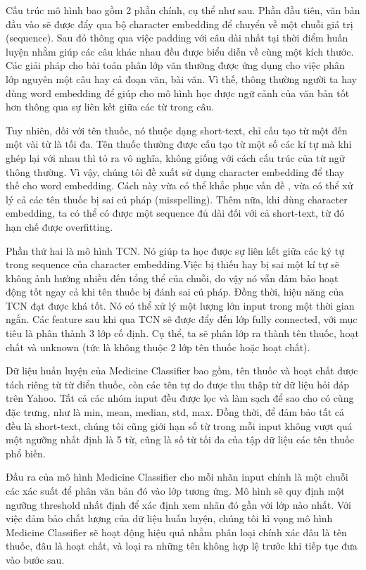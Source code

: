 Cấu trúc mô hình bao gồm 2 phần chính, cụ thể như sau. Phần đầu tiên, văn bản đầu vào sẽ được đẩy qua bộ character embedding để chuyển về một chuỗi giá trị (sequence). Sau đó thông qua việc padding với câu dài nhất tại thời điểm huấn luyện nhằm giúp các câu khác nhau đều được biểu diễn về cùng một kích thước. Các giải pháp cho bài toán phân lớp văn thường được ứng dụng cho việc phân lớp nguyên một câu hay cả đoạn văn, bài văn. Vì thế, thông thường người ta hay dùng word embedding để giúp cho mô hình học được ngữ cảnh của văn bản tốt hơn thông qua sự liên kết giữa các từ trong câu. 

Tuy nhiên, đối với tên thuốc, nó thuộc dạng short-text, chỉ cấu tạo từ một đến một vài từ là tối đa. Tên thuốc thường được cấu tạo từ một số các kí tự mà khi ghép lại với nhau thì tỏ ra vô nghĩa, không giống với cách cấu trúc của từ ngữ thông thường. Vì vậy, chúng tôi đề xuất sử dụng character embedding để thay thế cho word embedding. Cách này vừa có thể khắc phục vấn đề , vừa có thể xử lý cả các tên thuốc bị sai cú pháp (misspelling). Thêm nữa, khi dùng character embedding, ta có thể có được một sequence đủ dài đối với cả short-text, từ đó hạn chế được overfitting.

Phần thứ hai là mô hình TCN. Nó giúp ta học được sự liên kết giữa các ký tự trong sequence của character embedding.Việc bị thiếu hay bị sai một kí tự sẽ không ảnh hưởng nhiều đến tổng thể của chuỗi, do vậy nó vẫn đảm bảo hoạt động tốt ngay cả khi tên thuốc bị đánh sai cú pháp. Đồng thời, hiệu năng của TCN đạt được khá tốt. Nó có thể xử lý một lượng lớn input trong một thời gian ngắn. Các feature sau khi qua TCN sẽ được đẩy đến lớp fully connected, với mục tiêu là phân thành 3 lớp cố định. Cụ thể, ta sẽ phân lớp ra thành tên thuốc, hoạt chất và unknown (tức là không thuộc 2 lớp tên thuốc hoặc hoạt chất).

Dữ liệu huấn luyện của Medicine Classifier bao gồm, tên thuốc và hoạt chất được tách riêng từ từ điển thuốc, còn các tên tự do được thu thập từ dữ liệu hỏi đáp trên Yahoo. Tất cả các nhóm input đều được lọc và làm sạch để sao cho có cùng đặc trưng, như là min, mean, median, std, max. Đồng thời, để đảm bảo tất cả đều là short-text, chúng tôi cũng giới hạn số từ trong mỗi input không vượt quá một ngưỡng nhất định là 5 từ, cũng là số từ tối đa của tập dữ liệu các tên thuốc phổ biến. 

Đầu ra của mô hình Medicine Classifier cho mỗi nhãn input chính là một chuỗi các xác suất để phân văn bản đó vào lớp tương ứng. Mô hình sẽ quy định một ngưỡng threshold nhất định để xác định xem nhãn đó gần với lớp nào nhất. Với việc đảm bảo chất lượng của dữ liệu huấn luyện, chúng tôi kì vọng mô hình Medicine Classifier sẽ hoạt động hiệu quả nhằm phân loại chính xác đâu là tên thuốc, đâu là hoạt chất, và loại ra những tên không hợp lệ trước khi tiếp tục đưa vào bước sau.

